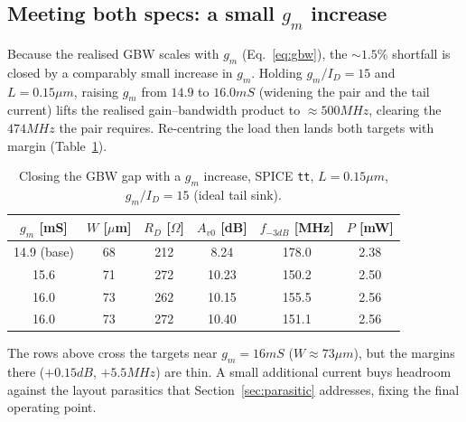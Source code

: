 \documentclass{article}
\begin{document}
\subsection{Meeting both specs: a small $g_m$ increase}
\label{sec:hit}
Because the realised GBW scales with $g_m$ (Eq.~\eqref{eq:gbw}), the $\sim1.5\%$
shortfall is closed by a comparably small increase in $g_m$. Holding $g_m/I_D=15$ and $L=0.15\mu m$, raising $g_m$ from
$14.9$ to $16.0mS$ (widening the pair and the tail current) lifts the realised
gain--bandwidth product to $\approx500MHz$, clearing the $474MHz$ the pair requires.
Re-centring the load then lands both targets with margin (Table~\ref{tab:hit}).

\begin{table}[H]
    \centering
    \caption{Closing the GBW gap with a $g_m$ increase, SPICE
             \texttt{tt}, $L=0.15\mu m$, $g_m/I_D=15$ (ideal tail sink).}
    \label{tab:hit}
    \begin{tabular}{c|c|c|c|c|c} \hline
        $g_m$ [mS] & $W$ [$\mu$m] & $R_D$ [$\Omega$] & $A_{v0}$ [dB] & $f_{-3dB}$ [MHz] & $P$ [mW] \\ \hline
        14.9 (base) & 68 & 212 & 8.24 & 178.0 & 2.38 \\ \hline
        15.6 & 71 & 272 & 10.23 & 150.2 & 2.50 \\ \hline
        16.0 & 73 & 262 & 10.15 & 155.5 & 2.56 \\ \hline
        16.0 & 73 & 272 & 10.40 & 151.1 & 2.56 \\ \hline
    \end{tabular}
\end{table}

The rows above cross the targets near $g_m=16mS$ ($W\approx73\mu m$), but the margins
there ($+0.15dB$, $+5.5MHz$) are thin. A small additional current buys headroom against
the layout parasitics that Section~\ref{sec:parasitic} addresses, fixing the final
operating point.
\end{document}
